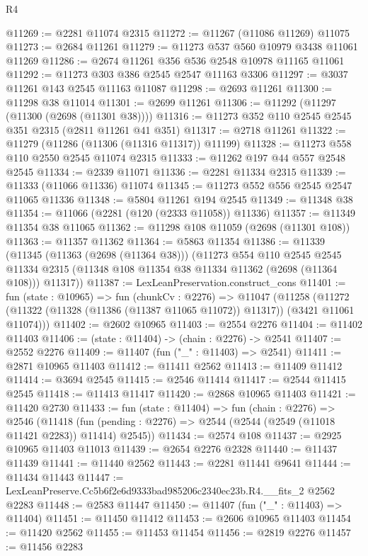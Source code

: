 \begin{lexlean}{R4}
\begin{coremodule}
@11269 := @2281 @11074 @2315
@11272 := @11267 (@11086 @11269) @11075
@11273 := @2684 @11261
@11279 := @11273 @537 @560 @10979 @3438 @11061 @11269
@11286 := @2674 @11261 @356 @536 @2548 @10978 @11165 @11061
@11292 := @11273 @303 @386 @2545 @2547 @11163 @3306
@11297 := @3037 @11261 @143 @2545 @11163 @11087
@11298 := @2693 @11261
@11300 := @11298 @38 @11014
@11301 := @2699 @11261
@11306 := @11292 (@11297 (@11300 (@2698 (@11301 @38))))
@11316 := @11273 @352 @110 @2545 @2545 @351 @2315 (@2811 @11261 @41 @351)
@11317 := @2718 @11261
@11322 := @11279 (@11286 (@11306 (@11316 @11317)) @11199)
@11328 := @11273 @558 @110 @2550 @2545 @11074 @2315
@11333 := @11262 @197 @44 @557 @2548 @2545
@11334 := @2339 @11071
@11336 := @2281 @11334 @2315
@11339 := @11333 (@11066 @11336) @11074
@11345 := @11273 @552 @556 @2545 @2547 @11065 @11336
@11348 := @5804 @11261 @194 @2545
@11349 := @11348 @38
@11354 := @11066 (@2281 (@120 (@2333 @11058)) @11336)
@11357 := @11349 @11354 @38 @11065
@11362 := @11298 @108 @11059 (@2698 (@11301 @108))
@11363 := @11357 @11362
@11364 := @5863 @11354
@11386 := @11339
    (@11345
      (@11363 (@2698 (@11364 @38)))
      (@11273
        @554
        @110
        @2545
        @2545
        @11334
        @2315
        (@11348 @108 @11354 @38 @11334 @11362 (@2698 (@11364 @108)))
        @11317))
@11387 := LexLeanPreservation.construct_cons
@11401 := fun (state : @10965) =>
  fun (chunkCv : @2276) =>
  @11047
    (@11258 (@11272 (@11322 (@11328 (@11386 (@11387 @11065 @11072)) @11317)) (@3421 @11061 @11074)))
@11402 := @2602 @10965
@11403 := @2554 @2276
@11404 := @11402 @11403
@11406 := (state : @11404) -> (chain : @2276) -> @2541
@11407 := @2552 @2276
@11409 := @11407 (fun ("_" : @11403) => @2541)
@11411 := @2871 @10965 @11403
@11412 := @11411 @2562
@11413 := @11409 @11412
@11414 := @3694 @2545
@11415 := @2546 @11414
@11417 := @2544 @11415 @2545
@11418 := @11413 @11417
@11420 := @2868 @10965 @11403
@11421 := @11420 @2730
@11433 := fun (state : @11404) =>
  fun (chain : @2276) =>
  @2546 (@11418 (fun (pending : @2276) => @2544 (@2544 (@2549 (@11018 @11421 @2283)) @11414) @2545))
@11434 := @2574 @108
@11437 := @2925 @10965 @11403 @11013
@11439 := @2654 @2276 @2328
@11440 := @11437 @11439
@11441 := @11440 @2562
@11443 := @2281 @11441 @9641
@11444 := @11434 @11443
@11447 := LexLeanPreserve.Cc5b6f2e6d9333bad985206c2340ec23b.R4.__fits_2 @2562 @2283
@11448 := @2583 @11447
@11450 := @11407 (fun ("_" : @11403) => @11404)
@11451 := @11450 @11412
@11453 := @2606 @10965 @11403
@11454 := @11420 @2562
@11455 := @11453 @11454
@11456 := @2819 @2276
@11457 := @11456 @2283

\end{coremodule}
\end{lexlean}
